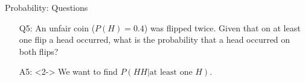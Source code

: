 \documentclass[10pt, handout, xcolor=table]{beamer}
\begin{document}
\begin{frame}{Probability: Questions}

\begin{itemize}
  \setlength{\itemsep}{15pt}
\item[Q5:] An unfair coin ($P(H) = 0.4$) was flipped twice. Given that on at least one flip a head occurred, what is the probability that a head occurred on both flips?
\item[A5:]<2-> \color{red} 
We want to find $P(HH | \text{at least one } H)$.
\end{itemize}
\end{frame}
\end{document}
